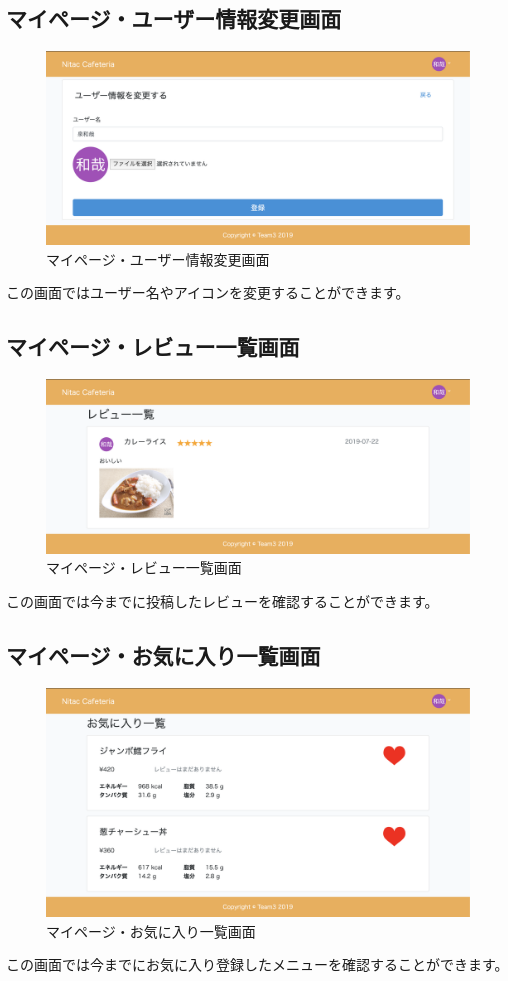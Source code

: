 \documentclass[a4paper]{jsarticle}
\begin{document}
\subsection{マイページ・ユーザー情報変更画面}
\begin{figure}[htbp]
	\centering
	\includegraphics[scale = 0.225]{image/edit_user.png}
	\caption{マイページ・ユーザー情報変更画面}
\end{figure}
この画面ではユーザー名やアイコンを変更することができます。
\subsection{マイページ・レビュー一覧画面}
\begin{figure}[htbp]
\centering
\includegraphics[scale = 0.225]{image/myreview.png}
\caption{マイページ・レビュー一覧画面}
\end{figure}
この画面では今までに投稿したレビューを確認することができます。
\newpage
\subsection{マイページ・お気に入り一覧画面}
\begin{figure}[htbp]
\centering
\includegraphics[scale = 0.225]{image/myfavorite.png}
\caption{マイページ・お気に入り一覧画面}
\end{figure}
この画面では今までにお気に入り登録したメニューを確認することができます。
\newpage
\end{document}
